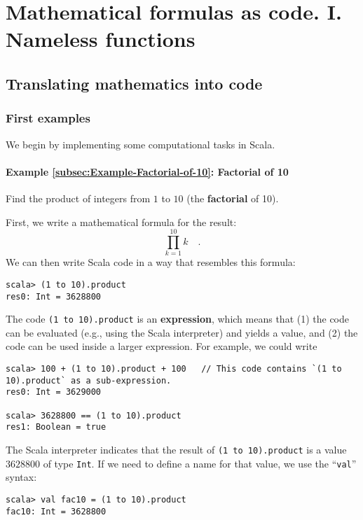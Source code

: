 
\chapter{Mathematical formulas as code. I. Nameless functions\label{chap:1-Values,-types,-expressions,}}

\section{Translating mathematics into code}

\subsection{First examples}

We begin by implementing some computational tasks in Scala.

\subsubsection{Example \label{subsec:Example-Factorial-of-10}\ref{subsec:Example-Factorial-of-10}:
Factorial of 10}

Find the product of integers from $1$ to $10$ (the \textbf{factorial}
of 10).

First, we write a mathematical formula for the result:
\[
\prod_{k=1}^{10}k\quad.
\]
We can then write Scala code in a way that resembles this formula:
\begin{lstlisting}
scala> (1 to 10).product
res0: Int = 3628800
\end{lstlisting}

The code \texttt{}\lstinline!(1 to 10).product! is an \textbf{expression},
which means that (1) the code can be evaluated (e.g., using the Scala
interpreter) and yields a value, and (2) the code can be used inside
a larger expression. For example, we could write
\begin{lstlisting}
scala> 100 + (1 to 10).product + 100   // This code contains `(1 to 10).product` as a sub-expression.
res0: Int = 3629000

scala> 3628800 == (1 to 10).product 
res1: Boolean = true
\end{lstlisting}
The Scala interpreter indicates that the result of \texttt{}\lstinline!(1 to 10).product!
is a value $3628800$ of type \lstinline!Int!. If we need to define
a name for that value, we use the \textsf{``}\lstinline!val!\textsf{''} syntax:
\begin{lstlisting}
scala> val fac10 = (1 to 10).product
fac10: Int = 3628800
\end{lstlisting}


